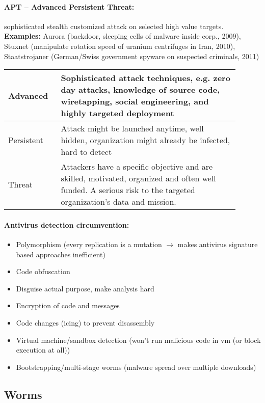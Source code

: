 \paragraph{APT -- Advanced Persistent Threat:} sophisticated stealth customized attack on selected high value targets.\\
\textbf{Examples:} Aurora (backdoor, sleeping cells of malware inside corp., 2009), Stuxnet (manipulate rotation speed of uranium centrifuges in Iran, 2010), Staatstrojaner (German/Swiss government spyware on suspected criminals, 2011)

\begin{tabular}{p{0.2\linewidth}p{0.7\linewidth}}
Advanced & Sophisticated attack techniques, e.g. zero
day attacks, knowledge of source code, wiretapping, social
engineering, and highly targeted deployment \\
\hline
Persistent & Attack might be launched anytime, well hidden, organization might already be infected, hard to detect \\
\hline
Threat & Attackers have a specific objective and are skilled,
motivated, organized and often well funded. A serious risk to
the ‏targeted ‏organization’s‏ data ‏and ‏mission. \\
\end{tabular}

\paragraph{Antivirus detection circumvention:}
\begin{itemize}
\item Polymorphism (every replication is a mutation $\to$ makes antivirus signature based approaches inefficient)
\item Code obfuscation
\item Disguise actual purpose, make analysis hard
\item Encryption of code and messages
\item Code changes (icing) to prevent disassembly
\item Virtual machine/sandbox detection (won’t run malicious code in vm (or block execution at all))
\item Bootstrapping/multi-stage worms (malware spread over multiple downloads)
\end{itemize}

\subsection{Worms}

